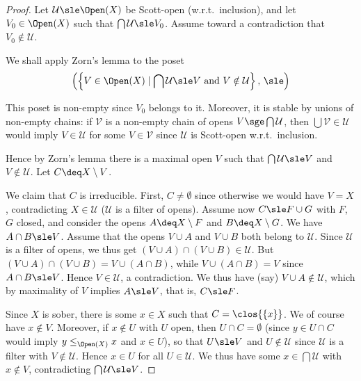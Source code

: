 \begin{proof}
Let $\mathcal{U} \sle \Open(X)$ be Scott-open (w.r.t.\ inclusion),
and let $V_0 \in \Open(X)$ such that $\bigcap \mathcal{U} \sle V_0$.
Assume toward a contradiction that $V_0 \notin \mathcal{U}$.

We shall apply Zorn's lemma to the poset
\[
  \left(
    \left\{ V \in \Open(X)
    \mid
    \bigcap \mathcal{U} \sle V
    ~\text{and}~
    V \notin \mathcal{U}
    \right\}
    ,\,
    \sle
  \right)
\]

\noindent
This poset is non-empty since $V_0$ belongs to it.
Moreover, it is stable by unions of non-empty chains:
if $\mathcal{V}$ is a non-empty chain of opens $V \sge \bigcap \mathcal{U}$,
then $\bigcup \mathcal{V} \in \mathcal{U}$ would imply
$V \in \mathcal{U}$ for some $V \in \mathcal{V}$ since $\mathcal{U}$
is Scott-open w.r.t.\ inclusion.

Hence by Zorn's lemma there is a maximal open $V$
such that $\bigcap \mathcal{U} \sle V$
and $V \notin \mathcal{U}$.
Let $C \deq X \setminus V$.

We claim that $C$ is irreducible.
First, $C \neq \emptyset$
since otherwise we would have $V = X$, contradicting $X \in \mathcal{U}$
($\mathcal{U}$ is a filter of opens).
%
Assume now $C \sle F \cup G$ with $F$, $G$ closed,
and consider the opens $A \deq X \setminus F$
and $B \deq X \setminus G$.
We have $A \cap B \sle V$.
Assume that the opens $V \cup A$ and $V \cup B$ both belong to $\mathcal{U}$.
Since $\mathcal{U}$ is a filter of opens,
we thus get
$(V \cup A) \cap (V \cup B) \in \mathcal{U}$.
But $(V \cup A) \cap (V \cup B) = V \cup (A \cap B)$,
while $V \cup (A \cap B) = V$ since $A \cap B \sle V$.
Hence $V \in \mathcal{U}$, a contradiction.
We thus have (say) $V \cup A \notin \mathcal{U}$,
which by maximality of $V$ implies $A \sle V$,
that is, $C \sle F$.

Since $X$ is sober, there is some $x \in X$
such that $C = \clos{\{x\}}$.
We of course have $x \notin V$.
Moreover, if $x \notin U$ with $U$ open,
then $U \cap C = \emptyset$
(since $y \in U \cap C$ would imply $y \leq_{\Open(X)} x$ and $x \in U$),
so that $U \sle V$
and $U \notin \mathcal{U}$ since $\mathcal{U}$ is a filter with $V \notin \mathcal{U}$.
Hence $x \in U$ for all $U \in \mathcal{U}$.
We thus have some $x \in \bigcap \mathcal{U}$ with $x \notin V$,
contradicting $\bigcap \mathcal{U} \sle V$.
\end{proof}

